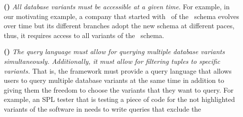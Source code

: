 %
\begin{enumerate}
\itemsep0em
\item [\textbf{(\nZero)}]
\emph{All database variants must be accessible at a given time}.
For example, in our motivating example, a company that started with 
\vOne\ of the \basic\ schema evolves over time but its different 
branches adopt the new schema at different paces, thus, it 
requires access to all variants of the \basic\ schema. 
%
%
%
\item [\textbf{(\nOne)}]
\emph{The query language must allow for querying
multiple database variants simultaneously.
Additionally, it must allow for filtering tuples to specific variants.}
That is, the framework must provide a query language that allows users to query multiple
database variants at the same time in addition to giving them the freedom to choose
the variants that they want to query. 
For example, an SPL tester that is testing a piece of code for the not highlighted 
variants of the software in  needs to write queries that exclude the 

\end{enumerate}
